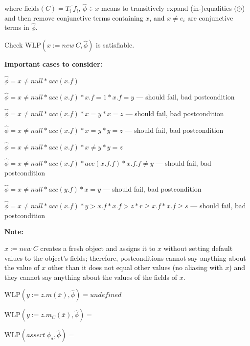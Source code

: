 \documentclass {article}
\newcommand{\fphi}{\widehat{\phi}}
\newcommand{\wlp}[2]{\text{WLP}(#1,#2)}
\begin{document}
where fields$(C) = \overline{T_i \ f_i}$, $\fphi \div x$ means to transitively expand (in-)equalities ($\odot$) and then remove conjunctive terms containing $x$, and $\overline{x \neq e_i}$ are conjunctive terms in $\fphi$. 

Check $\wlp{x := new\ C}{\fphi}$ is satisfiable.

\textbf{Important cases to consider:}

$\fphi = x \neq null \ast acc(x.f)$

$\fphi = x \neq null \ast acc(x.f) \ast x.f = 1 \ast x.f = y$ --- should fail, bad postcondition

$\fphi = x \neq null \ast acc(x.f) \ast x = y \ast x = z$ --- should fail, bad postcondition

$\fphi = x \neq null \ast acc(x.f) \ast x = y \ast y = z$ --- should fail, bad postcondition

$\fphi = x \neq null \ast acc(x.f) \ast x \neq y \ast y = z$

$\fphi = x \neq null \ast acc(x.f) \ast acc(x.f.f) \ast x.f.f \neq y$ --- should fail, bad postcondition

$\fphi = x \neq null \ast acc(y.f) \ast x = y$ --- should fail, bad postcondition

$\fphi = x \neq null \ast acc(x.f) \ast y > x.f \ast x.f > z \ast r \geq x.f \ast x.f \geq s$ --- should fail, bad postcondition


\textbf{Note:}

$x := new \ C$ creates a fresh object and assigns it to $x$ without setting default values to the object's fields; therefore, postconditions cannot say anything about the value of $x$ other than it does not equal other values (no aliasing with $x$) and they cannot say anything about the values of the fields of $x$.

\vspace{0.5cm}

$\wlp{y := z.m(\overline{x})}{\fphi} = undefined$

\vspace{0.5cm}

$\wlp{y := z.m_C(\overline{x})}{\fphi} = $

\vspace{0.5cm}

$\wlp{assert\ \phi_a}{\fphi} = $
\end{document}
